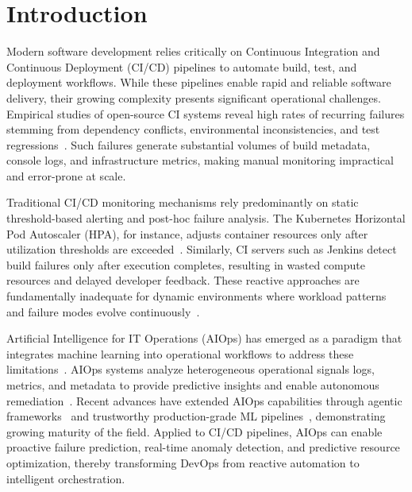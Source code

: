 \documentclass[sn-nature]{sn-jnl}
\theoremstyle{thmstyleone}
\theoremstyle{thmstyletwo}
\theoremstyle{thmstylethree}
\begin{document}
\section{Introduction}\label{sec:introduction}

Modern software development relies critically on Continuous Integration and Continuous Deployment (CI/CD) pipelines to automate build, test, and deployment workflows. While these pipelines enable rapid and reliable software delivery, their growing complexity presents significant operational challenges. Empirical studies of open-source CI systems reveal high rates of recurring failures stemming from dependency conflicts, environmental inconsistencies, and test regressions~\cite{rausch2017empirical, beller2017oops}. Such failures generate substantial volumes of build metadata, console logs, and infrastructure metrics, making manual monitoring impractical and error-prone at scale.

Traditional CI/CD monitoring mechanisms rely predominantly on static threshold-based alerting and post-hoc failure analysis. The Kubernetes Horizontal Pod Autoscaler (HPA), for instance, adjusts container resources only after utilization thresholds are exceeded~\cite{kubernetesDocs}. Similarly, CI servers such as Jenkins detect build failures only after execution completes, resulting in wasted compute resources and delayed developer feedback. These reactive approaches are fundamentally inadequate for dynamic environments where workload patterns and failure modes evolve continuously~\cite{kanahols2025timeseries}.

Artificial Intelligence for IT Operations (AIOps) has emerged as a paradigm that integrates machine learning into operational workflows to address these limitations~\cite{dang2019aiops}. AIOps systems analyze heterogeneous operational signals logs, metrics, and metadata to provide predictive insights and enable autonomous remediation~\cite{notaro2021aiops}. Recent advances have extended AIOps capabilities through agentic frameworks~\cite{zota2025agentic} and trustworthy production-grade ML pipelines~\cite{bayram2025trustworthy}, demonstrating growing maturity of the field. Applied to CI/CD pipelines, AIOps can enable proactive failure prediction, real-time anomaly detection, and predictive resource optimization, thereby transforming DevOps from reactive automation to intelligent orchestration.
\end{document}
